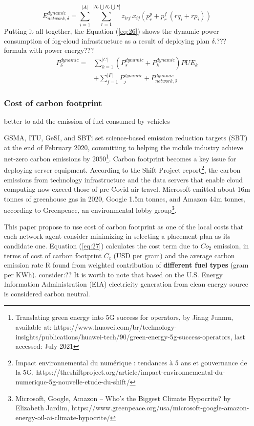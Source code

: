 \documentclass[twocolumn]{article}
\begin{document}
\begin{equation}
E^{dynamic}_{network,\delta} = \sum_{i=1}^{|A|} \sum_{r=1}^{|R_{c}\bigcup R_{e}\bigcup P|} z_{irj} \ x_{ij} (p_{r}^{p} + p_{r}^{f} \ (rq_{i}+rp_{i}))
\label{eq:25}
\end{equation}
Putting it all together, the Equation (\ref{eq:26}) shows the dynamic power consumption of fog-cloud infrastructure as a result of deploying plan $\delta$.??? formula with power energy???
\begin{equation}
\begin{aligned}
P_{\delta}^{dynamic} = &\sum_{k=1}^{|C|}(P^{dynamic}_{s} +  P^{dynamic}_{k})PUE_{k}\\
					   &+\sum_{j=1}^{|F|} P^{dynamic}_{j} + P^{dynamic}_{network,\delta}
\end{aligned}
\label{eq:26}
\end{equation}

\subsubsection{Cost of carbon footprint}
\par better to add the emission of fuel consumed by vehicles 
\par GSMA, ITU, GeSI, and SBTi set science-based emission reduction targets (SBT) at the end of February 2020, committing to helping the mobile industry achieve net-zero carbon emissions by 2050\footnote{Translating green energy into 5G success for operators, by Jiang Junmu, available at: https://www.huawei.com/br/technology-insights/publications/huawei-tech/90/green-energy-5g-success-operators, last accessed: July 2021}. 
Carbon footprint becomes a key issue for deploying server equipment. According to the Shift Project report\footnote{Impact environnemental du numérique : tendances à 5 ans et gouvernance de la 5G, https://theshiftproject.org/article/impact-environnemental-du-numerique-5g-nouvelle-etude-du-shift/}, the carbon emissions from technology infrastructure and the data servers that enable cloud computing now exceed those of pre-Covid air travel. Microsoft emitted about 16m tonnes of greenhouse gas in 2020, Google 1.5m tonnes, and Amazon 44m tonnes, according to Greenpeace, an environmental lobby group\footnote{Microsoft, Google, Amazon – Who’s the Biggest Climate Hypocrite? by Elizabeth Jardim, https://www.greenpeace.org/usa/microsoft-google-amazon-energy-oil-ai-climate-hypocrite/}.
\par This paper propose to use cost of carbon footprint as one of the local costs that each network agent consider minimizing in selecting a placement plan as its candidate one.
Equation (\ref{eq:27}) calculates the cost term due to $Co_{2}$ emission, in terms of cost of carbon footprint $C_{c}$ (USD per gram) and the average carbon emission rate R found from weighted contribution of \textbf{different fuel types} (gram per KWh)\cite{hussain2019fog}. consider:?? It is worth to note that based on the U.S. Energy Information Administration (EIA) electricity generation from clean energy source is considered carbon neutral.
\end{document}
